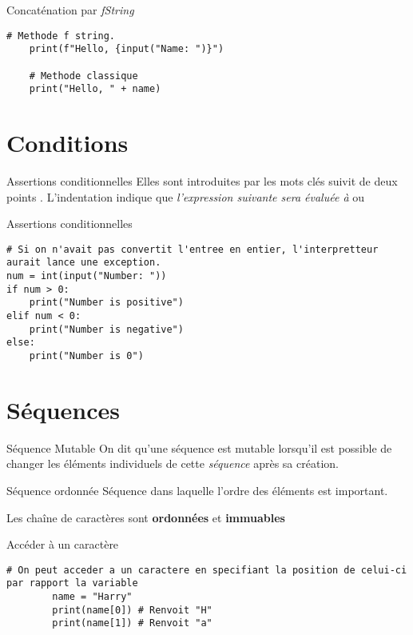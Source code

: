 \documentclass{report}
\begin{document}
\begin{EExample*}{Concaténation par \textit{fString}}{}
\begin{lstlisting}[style=PythonDraculaWhite]
	# Methode f string.
	print(f"Hello, {input("Name: ")}")

	# Methode classique
	print("Hello, " + name)
\end{lstlisting}
\end{EExample*}



\section{Conditions}
\begin{Syntaxe*}{Assertions conditionnelles}{}
Elles sont introduites par les mots clés  
  suivit de deux points
\entouree[gray]{\texttt{\footnotesize{:}}}. L'indentation indique que \textit{l'expression suivante sera évaluée
à}  ou 
\end{Syntaxe*}

\begin{EExample*}{Assertions conditionnelles}{}
	\begin{lstlisting}[style=PythonDraculaWhite]
# Si on n'avait pas convertit l'entree en entier, l'interpretteur aurait lance une exception. 	
num = int(input("Number: "))
if num > 0:
    print("Number is positive")
elif num < 0:
    print("Number is negative")
else:
    print("Number is 0")
	\end{lstlisting}
\end{EExample*}


\section{Séquences}
\begin{DefG*}{Séquence Mutable}{}
	On dit qu'une séquence est mutable lorsqu'il est possible de changer les éléments individuels de cette 
	\textit{séquence} après sa création. 
\end{DefG*}
\begin{DefG*}{Séquence ordonnée}{}
	Séquence dans laquelle l'ordre des éléments est important. 
\end{DefG*}


\begin{note}
Les chaîne de caractères sont \textbf{ordonnées} et \textbf{immuables}
\end{note}
\begin{EExample*}{Accéder à un caractère}{}
	\begin{lstlisting}[style=PythonDraculaWhite]
		# On peut acceder a un caractere en specifiant la position de celui-ci par rapport la variable
		name = "Harry"
        print(name[0]) # Renvoit "H"
        print(name[1]) # Renvoit "a"

	\end{lstlisting}
\end{EExample*}
\end{document}

